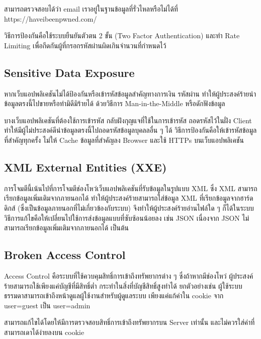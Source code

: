 สามารถตรวจสอบได้ว่า email เราอยู่ในฐานข้อมูลที่รั่วไหลหรือไม่ได้ที่ https://haveibeenpwned.com/

วิธีการป้องกันคือใช้ระบบยืนยันตัวตน 2 ขั้น (Two Factor Authentication) \cite{???} และทำ Rate Limiting เพื่อกีดกันผู้ที่กรอกรหัสผ่านผิดเกินจำนวนที่กำหนดไว้

\subsection{Sensitive Data Exposure}
หากเว็บแอปพลิเคชันไม่ได้ป้องกันหรือเข้ารหัสข้อมูลสำคัญทางการเงิน รหัสผ่าน ทำให้ผู้ประสงค์ร้ายนำข้อมูลตรงนี้ไปขายหรือทำมิดีมิร้ายได้ ด้วยวิธีการ Man-in-the-Middle \cite{???} หรือดักฟังข้อมูล

บางเว็บแอปพลิเคชันที่ต้องใช้การเข้ารหัส กลับฝังกุญแจที่ใช้ในการเข้ารหัส ถอดรหัสไว้ในฝั่ง Client ทำให้มีผู้ไม่ประสงค์ดีนำข้อมูลตรงนี้ไปถอดรหัสข้อมูลบุคลลอื่น ๆ ได้
วิธีการป้องกันคือให้เข้ารหัสข้อมูลที่สำคัญทุกครั้ง ไม่ให้ Cache ข้อมูลที่สำคัญลง Browser และใช้ HTTPs บนเว็บแอปพลิเคชัน

\subsection{XML External Entities (XXE)}
การโจมตีนี้เน้นไปที่การโจมตีช่องโหว่เว็บแอปพลิเคชันที่รับข้อมูลในรูปแบบ XML \cite{???} ซึ่ง XML สามารถเรียกข้อมูลเพิ่มเติมจากภายนอกได้ ทำให้ผู้ประสงค์ร้ายสามารถใส่ข้อมูล XML ที่เรียกข้อมูลจากฮาร์ดดิกส์ (ซึ่งเป็นข้อมูลภายนอกที่ไม่เกี่ยวข้องกับระบบ) จึงทำให้ผู้ประสงค์ร้ายอ่านไฟล์ใด ๆ ก็ได้ในระบบ \cite{???}
วิธีการแก้ไขคือให้เปลี่ยนไปใช้การส่งข้อมูลแบบที่ซับซ้อนน้อยลง เช่น JSON เนื่องจาก JSON ไม่สามารถเรียกข้อมูลเพิ่มเติมจากภายนอกได้ เป็นต้น

\subsection{Broken Access Control}

Access Control คือระบบที่ใช้ควบคุมสิทธิ์การเข้าถึงทรัพยากรต่าง ๆ ซึ่งถ้าหากมีช่องโหว่ ผู้ประสงค์ร้ายสามารถใช้เพียงแค่บัญชีที่มีสิทธิ์ต่ำ กระทำในสิ่งที่บัญชีสิทธิ์สูงทำได้ ยกตัวอย่างเช่น ผู้ใช้ระบบธรรมดาสามารถเข้าถึงหน้าดูแลผู้ใช้งานสำหรับผู้ดูแลระบบ เพียงแค่แก้ค่าใน cookie จาก user=guest เป็น user=admin

สามารถแก้ไขได้โดยให้มีการตรวจสอบสิทธิ์การเข้าถึงทรัพยากรบน Server เท่านั้น และไม่ควรใส่ค่าที่สามารถเดาได้ง่ายลงบน cookie

